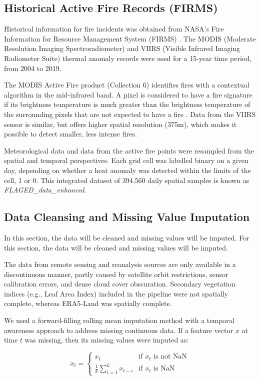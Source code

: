 \documentclass[journal, 10pt, twocolumn]{IEEEtran}
\begin{document}
\subsection{Historical Active Fire Records (FIRMS)}
Historical information for fire incidents was obtained from NASA's Fire Information for Resource Management System (FIRMS) \cite{b6}. The MODIS (Moderate Resolution Imaging Spectroradiometer) and VIIRS (Visible Infrared Imaging Radiometer Suite) thermal anomaly records were used for a 15-year time period, from 2004 to 2019.

The MODIS Active Fire product (Collection 6) identifies fires with a contextual algorithm in the mid-infrared band. A pixel is considered to have a fire signature if its brightness temperature is much greater than the brightness temperature of the surrounding pixels that are not expected to have a fire \cite{b37}. Data from the VIIRS sensor is similar, but offers higher spatial resolution (375m), which makes it possible to detect smaller, less intense fires.

Meteorological data and data from the active fire points were resampled from the spatial and temporal perspectives. Each grid cell was labelled binary on a given day, depending on whether a heat anomaly was detected within the limits of the cell, 1 or 0. This integrated dataset of 394,560 daily spatial samples is known as \textit{FLAGED\_data\_enhanced}.

\subsection{Data Cleansing and Missing Value Imputation}
In this section, the data will be cleaned and missing values will be imputed. For this section, the data will be cleaned and missing values will be imputed.

The data from remote sensing and reanalysis sources are only available in a discontinuous manner, partly caused by satellite orbit restrictions, sensor calibration errors, and dense cloud cover obscuration. Secondary vegetation indices (e.g., Leaf Area Index) included in the pipeline were not spatially complete, whereas ERA5-Land was spatially complete.

We used a forward-filling rolling mean imputation method with a temporal awareness approach to address missing continuous data. If a feature vector $x$ at time $t$ was missing, then its missing values were imputed as:

\begin{equation}
x_t = \begin{cases} 
x_t & \text{if } x_t \text{ is not NaN} \\
\frac{1}{k} \sum_{i=1}^{k} x_{t-i} & \text{if } x_t \text{ is NaN}
\end{cases}
\end{equation}
\end{document}
